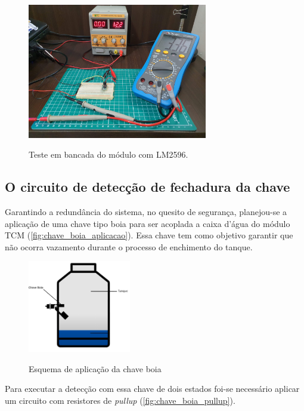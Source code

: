 \begin{figure}[H]
	\centering
	\caption{Teste em bancada do módulo com LM2596.}
	\includegraphics[width=0.7\textwidth]{figuras/conversor_buck_teste.jpg}
	\label{fig:conversor_buck_teste}
\end{figure}

\subsection{O circuito de detecção de fechadura da chave}

 Garantindo a redundância do sistema, no quesito de segurança, planejou-se a aplicação de uma chave tipo boia para ser acoplada a caixa d'água do módulo TCM (\autoref{fig:chave_boia_aplicacao}). Essa chave tem como objetivo garantir que não ocorra vazamento durante o processo de enchimento do tanque.

\begin{figure}[H]
	\centering
	\caption{Esquema de aplicação da chave boia}
	\includegraphics[width=0.4\textwidth]{figuras/chave_boia_aplicacao.png}
	\label{fig:chave_boia_aplicacao}
\end{figure}

Para executar a detecção com essa chave de dois estados foi-se necessário aplicar um circuito com resistores de \textit{pullup} (\autoref{fig:chave_boia_pullup}).

